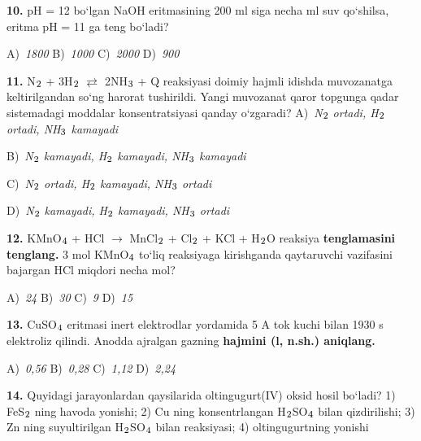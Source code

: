 \documentclass[11pt,a4paper]{article}
\renewcommand{\textsubscript}[1]{\ensuremath{_{\text{\fontsize{8}{8}\selectfont #1}}}}
\begin{document}
\begin{multicols}{2}
\noindent\textbf{10.} pH = 12 bo`lgan NaOH eritmasining 200 ml siga necha ml suv qo`shilsa, eritma pH = 11 ga teng bo`ladi?

\noindent A)~\textsl{1800} \hfill B)~\textsl{1000} \hfill C)~\textsl{2000} \hfill D)~\textsl{900}\par
\vspace{4pt}
\noindent\textbf{11.} N\textsubscript{2} + 3H\textsubscript{2} $\rightleftarrows$ 2NH\textsubscript{3} + Q reaksiyasi doimiy hajmli idishda muvozanatga keltirilgandan so`ng harorat tushirildi. Yangi muvozanat qaror topgunga qadar sistemadagi moddalar konsentratsiyasi qanday o`zgaradi?
\noindent A)~\textsl{N\textsubscript{2} ortadi, H\textsubscript{2} ortadi, NH\textsubscript{3} kamayadi}\par
\noindent B)~\textsl{N\textsubscript{2} kamayadi, H\textsubscript{2} kamayadi, NH\textsubscript{3} kamayadi}\par
\noindent C)~\textsl{N\textsubscript{2} ortadi, H\textsubscript{2} kamayadi, NH\textsubscript{3} ortadi}\par
\noindent D)~\textsl{N\textsubscript{2} kamayadi, H\textsubscript{2} kamayadi, NH\textsubscript{3} ortadi}\par
\vspace{4pt}
\noindent\textbf{12.} KMnO\textsubscript{4} + HCl $\to$ MnCl\textsubscript{2} + Cl\textsubscript{2} + KCl + H\textsubscript{2}O reaksiya \textbf{tenglamasini tenglang.} 3 mol KMnO\textsubscript{4} to`liq reaksiyaga kirishganda qaytaruvchi vazifasini bajargan HCl miqdori necha mol?

\noindent A)~\textsl{24} \hfill B)~\textsl{30} \hfill C)~\textsl{9} \hfill D)~\textsl{15}\par
\vspace{4pt}
\noindent\textbf{13.} CuSO\textsubscript{4} eritmasi inert elektrodlar yordamida 5 A tok kuchi bilan 1930 s elektroliz qilindi. Anodda ajralgan gazning \textbf{hajmini (l, n.sh.) aniqlang.}

\noindent A)~\textsl{0,56} \hfill B)~\textsl{0,28} \hfill C)~\textsl{1,12} \hfill D)~\textsl{2,24}\par
\vspace{4pt}
\noindent\textbf{14.} Quyidagi jarayonlardan qaysilarida oltingugurt(IV) oksid hosil bo`ladi? 1) FeS\textsubscript{2} ning havoda yonishi; 2) Cu ning konsentrlangan H\textsubscript{2}SO\textsubscript{4} bilan qizdirilishi; 3) Zn ning suyultirilgan H\textsubscript{2}SO\textsubscript{4} bilan reaksiyasi; 4) oltingugurtning yonishi


\end{multicols}
\end{document}
